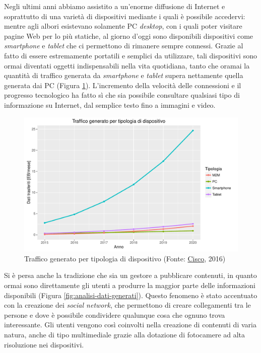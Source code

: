 Negli ultimi anni abbiamo assistito a un'enorme diffusione di Internet e soprattutto di una varietà di dispositivi mediante i quali è possibile accedervi: mentre agli albori esistevano solamente PC \emph{desktop}, con i quali poter visitare pagine Web per lo più statiche, al giorno d'oggi sono disponibili dispositivi come \emph{smartphone} e \emph{tablet} che ci permettono di rimanere sempre connessi. Grazie al fatto di essere estremamente portatili e semplici da utilizzare, tali dispositivi sono ormai diventati oggetti indispensabili nella vita quotidiana, tanto che oramai la quantità di traffico generata da \emph{smartphone} e \emph{tablet} supera nettamente quella generata dai PC (Figura \ref{fig:traffico-tipologia-dispositivo}). L'incremento della velocità delle connessioni e il progresso tecnologico ha fatto sì che sia possibile consultare qualsiasi tipo di informazione su Internet, dal semplice testo fino a immagini e video.

\begin{figure}[ht]
	\centering
	\includegraphics[width=\textwidth]{1-introduzione/Immagini/traffico-dispositivi.pdf}
	\caption[Traffico generato per tipologia di dispositivo]{Traffico generato per tipologia di dispositivo (Fonte: \href{http://www.cisco.com/c/en/us/solutions/collateral/service-provider/visual-networking-index-vni/mobile-white-paper-c11-520862.html}{Cisco}, 2016)\label{fig:traffico-tipologia-dispositivo}}
\end{figure}

Si è persa anche la tradizione che sia un gestore a pubblicare contenuti, in quanto ormai sono direttamente gli utenti a produrre la maggior parte delle informazioni disponibili (Figura \ref{fig:analisi-dati-generati}). Questo fenomeno è stato accentuato con la creazione dei \emph{social network}, che permettono di creare collegamenti tra le persone e dove è possibile condividere qualunque cosa che ognuno trova interessante. Gli utenti vengono così coinvolti nella creazione di contenuti di varia natura, anche di tipo multimediale grazie alla dotazione di fotocamere ad alta risoluzione nei dispositivi.

